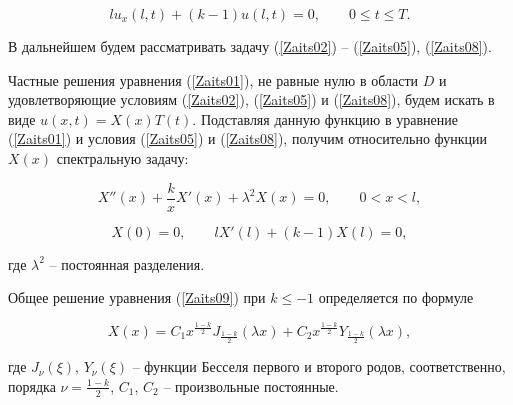\begin{equation}

\label{Zaits08}

lu_x(l,t)+(k-1)u(l,t)=0,\qquad 0\leq t\leq T.

\end{equation}



В дальнейшем будем рассматривать задачу (\ref{Zaits02}) -- (\ref{Zaits05}), (\ref{Zaits08}).






Частные решения уравнения (\ref{Zaits01}), не равные нулю в области $D$ и удовлетворяющие условиям (\ref{Zaits02}), (\ref{Zaits05}) и (\ref{Zaits08}), будем искать в виде $u(x,t)=X(x)T(t)$. Подставляя данную функцию в уравнение (\ref{Zaits01}) и условия (\ref{Zaits05}) и (\ref{Zaits08}), получим относительно функции $X(x)$ спектральную задачу:

\begin{equation}

\label{Zaits09}

X''(x)+\frac{k}{x}X'(x)+\lambda^2X(x)=0,\qquad 0<x<l,

\end{equation}

\begin{equation}

\label{Zaits10}

X(0)=0,\qquad lX'(l)+(k-1)X(l)=0,

\end{equation}

где $\lambda^2$ -- постоянная разделения.



Общее решение уравнения (\ref{Zaits09}) при $k\leq-1$ определяется по формуле

\begin{equation}

\label{Zaits11}

X(x)=C_1x^{\frac{1-k}{2}}J_{\frac{1-k}{2}}(\lambda x)+C_2x^{\frac{1-k}{2}}Y_{\frac{1-k}{2}}(\lambda x),

\end{equation}

где $\displaystyle J_{\nu}(\xi)$, $\displaystyle Y_{\nu}(\xi)$ -- функции Бесселя первого и второго родов, соответственно, порядка $\displaystyle \nu=\frac{1-k}{2}$, $C_1$, $C_2$ -- произвольные постоянные.



